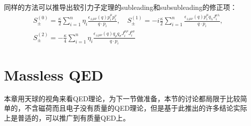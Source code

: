 同样的方法可以推导出软引力子定理的subleading和subsubleading的修正项\cite{PhysRevD.90.084035,PhysRev.168.1623,White:2014qia,Broedel:2014fsa}：
\begin{equation}
	\begin{gathered}
		S_{\pm}^{(0)}=\frac{\kappa}{2}\sum_{i=1}^{n}\eta_{i}\frac{\epsilon_{\pm\mu\nu}(q)p_{i}^{\mu}p_{i}^{\nu}}{q\cdot p_{i}},\quad S_{\pm}^{(1)}=-i\frac{\kappa}{2}\sum_{i=1}^{n}\frac{\epsilon_{\pm\mu\nu}(q)p_{i}^{\mu}q_{\lambda}J_{i}^{\nu\lambda}}{q\cdot p_{i}}, \\
		S_{\pm}^{(2)}=-\frac{\kappa}{4}\sum_{i=1}^{n}\eta_{i}\frac{\epsilon_{\pm\mu\nu}(q)q_{\rho}q_{\sigma}J_{i}^{\mu\rho}J_{i}^{\nu\sigma}}{q\cdot p_{i}}
	\end{gathered}
\end{equation}

\section{Massless QED}
本章用天球的视角来看QED理论，为下一节做准备，本节的讨论都局限于比较简单的，不含磁荷而且电子没有质量的QED理论，但是基于此推出的许多结论实际上是普适的，可以推广到有质量QED上\cite{Strominger:2017zoo}。
